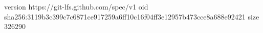 version https://git-lfs.github.com/spec/v1
oid sha256:3119b3c399c7c6871ce917259a6ff10c16f04ff3e12957b473cce8a688e92421
size 326290
